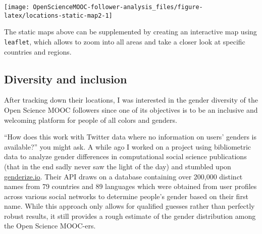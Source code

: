 \documentclass[]{article}
\newenvironment{Shaded}{\begin{snugshade}}{\end{snugshade}}
\newcommand{\KeywordTok}[1]{\textcolor[rgb]{0.13,0.29,0.53}{\textbf{#1}}}
\newcommand{\DataTypeTok}[1]{\textcolor[rgb]{0.13,0.29,0.53}{#1}}
\newcommand{\FloatTok}[1]{\textcolor[rgb]{0.00,0.00,0.81}{#1}}
\newcommand{\StringTok}[1]{\textcolor[rgb]{0.31,0.60,0.02}{#1}}
\newcommand{\CommentTok}[1]{\textcolor[rgb]{0.56,0.35,0.01}{\textit{#1}}}
\newcommand{\OperatorTok}[1]{\textcolor[rgb]{0.81,0.36,0.00}{\textbf{#1}}}
\newcommand{\NormalTok}[1]{#1}
\begin{document}
\begin{center}\texttt{[image: OpenScienceMOOC-follower-analysis\_files/figure-latex/locations-static-map2-1]} \end{center}

The static maps above can be supplemented by creating an interactive map
using \texttt{leaflet}, which allows to zoom into all areas and take a
closer look at specific countries and regions.

\begin{Shaded}
\end{Shaded}

\hypertarget{htmlwidget-3a90feb9eef4ce658233}{}

\subsection{Diversity and inclusion}\label{diversity-and-inclusion}

After tracking down their locations, I was interested in the gender
diversity of the Open Science MOOC followers since one of its objectives
is to be an inclusive and welcoming platform for people of all colors
and genders.

``How does this work with Twitter data where no information on users'
genders is available?'' you might ask. A while ago I worked on a project
using bibliometric data to analyze gender differences in computational
social science publications (that in the end sadly never saw the light
of the day) and stumbled upon
\href{https://genderize.io/}{genderize.io}. Their API draws on a
database containing over 200,000 distinct names from 79 countries and 89
languages which were obtained from user profiles across various social
networks to determine people's gender based on their first name. While
this approach only allows for qualified guesses rather than perfectly
robust results, it still provides a rough estimate of the gender
distribution among the Open Science MOOC-ers.
\end{document}
